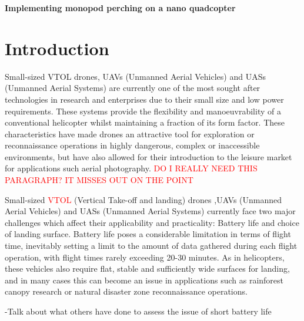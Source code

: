 \documentclass[12pt,a4paper]{article}
\begin{document}
\begin{titlepage}
	\begin{center}
	\Huge{\textbf{Implementing monopod perching on a nano quadcopter}}
	\end{center}
\end{titlepage}


\setcounter{page}{2}

\tableofcontents

\pagebreak

\listoffigures

\pagebreak

\listoftables

\pagebreak
\section{Introduction}
Small-sized VTOL drones, UAVs (Unmanned Aerial Vehicles) and UASs (Unmanned Aerial Systems) are currently one of the most sought after technologies in research and enterprises due to their small size and low power requirements. These systems provide the flexibility and manoeuvrability of a conventional helicopter whilst maintaining a fraction of its form factor. These characteristics have made drones an attractive tool for exploration or reconnaissance operations in highly dangerous, complex or inaccessible environments, but have also allowed for their introduction to the leisure market for applications such aerial photography. \textcolor{red}{DO I REALLY NEED THIS PARAGRAPH? IT MISSES OUT ON THE POINT}

Small-sized \textcolor{red}{VTOL} (Vertical Take-off and landing) drones ,UAVs (Unmanned Aerial Vehicles) and UASs (Unmanned Aerial Systems) currently face two major challenges which affect their applicability and practicality: Battery life and choice of landing surface. Battery life poses a considerable limitation in terms of flight time, inevitably setting a limit to the amount of data gathered during each flight operation, with flight times rarely exceeding 20-30 minutes. As in helicopters, these vehicles also require flat, stable and sufficiently wide surfaces for landing, and in many cases this can become an issue in applications such as rainforest canopy research or natural disaster zone reconnaissance operations.

-Talk about what others have done to assess the issue of short battery life
	
\end{document}

